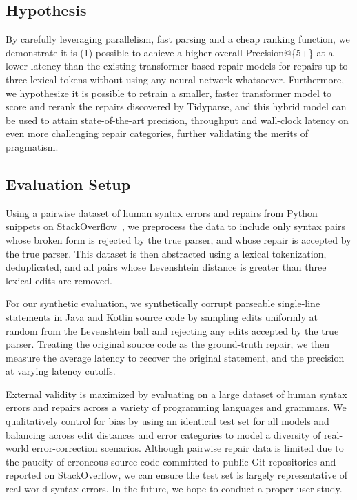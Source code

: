 \documentclass[sigplan,screen]{acmart}
\begin{document}
\subsection{Hypothesis}


By carefully leveraging parallelism, fast parsing and a cheap ranking function, we demonstrate it is (1) possible to achieve a higher overall Precision@\{5+\} at a lower latency than the existing transformer-based repair models for repairs up to three lexical tokens without using any neural network whatsoever. Furthermore, we hypothesize it is possible to retrain a smaller, faster transformer model to score and rerank the repairs discovered by Tidyparse, and this hybrid model can be used to attain state-of-the-art precision, throughput and wall-clock latency on even more challenging repair categories, further validating the merits of pragmatism.

\subsection{Evaluation Setup}


Using a pairwise dataset of human syntax errors and repairs from Python snippets on StackOverflow~\cite{wong2019syntax}, we preprocess the data to include only syntax pairs whose broken form is rejected by the true parser, and whose repair is accepted by the true parser. This dataset is then abstracted using a lexical tokenization, deduplicated, and all pairs whose Levenshtein distance is greater than three lexical edits are removed.

For our synthetic evaluation, we synthetically corrupt parseable single-line statements in Java and Kotlin source code by sampling edits uniformly at random from the Levenshtein ball and rejecting any edits accepted by the true parser. Treating the original source code as the ground-truth repair, we then measure the average latency to recover the original statement, and the precision at varying latency cutoffs.

External validity is maximized by evaluating on a large dataset of human syntax errors and repairs across a variety of programming languages and grammars. We qualitatively control for bias by using an identical test set for all models and balancing across edit distances and error categories to model a diversity of real-world error-correction scenarios. Although pairwise repair data is limited due to the paucity of erroneous source code committed to public Git repositories and reported on StackOverflow, we can ensure the test set is largely representative of real world syntax errors. In the future, we hope to conduct a proper user study.



\end{document}
